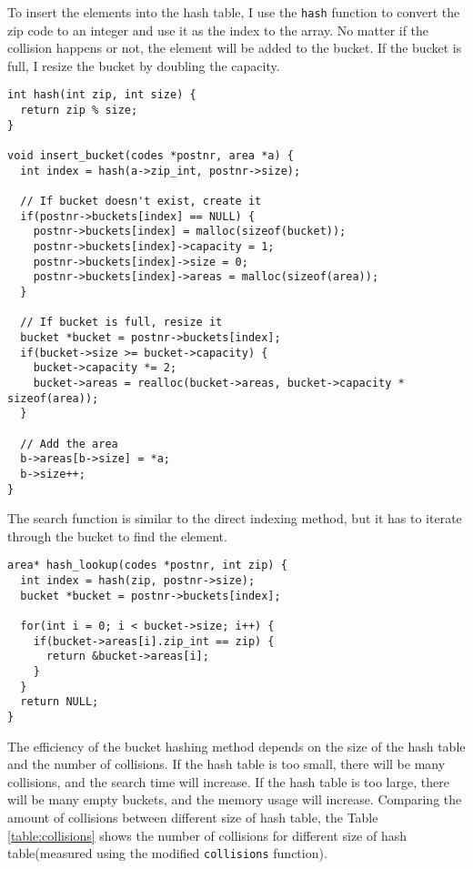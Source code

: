 \documentclass[a4paper,11pt]{article}
\begin{document}
To insert the elements into the hash table, I use the {\tt hash} function to convert the zip code to an integer
and use it as the index to the array. No matter if the collision happens or not, the element will be added to the bucket.
If the bucket is full, I resize the bucket by doubling the capacity.

\begin{verbatim}
int hash(int zip, int size) {
  return zip % size;
}

void insert_bucket(codes *postnr, area *a) {
  int index = hash(a->zip_int, postnr->size);
  
  // If bucket doesn't exist, create it
  if(postnr->buckets[index] == NULL) {
    postnr->buckets[index] = malloc(sizeof(bucket));
    postnr->buckets[index]->capacity = 1;
    postnr->buckets[index]->size = 0;
    postnr->buckets[index]->areas = malloc(sizeof(area));
  }
  
  // If bucket is full, resize it
  bucket *bucket = postnr->buckets[index];
  if(bucket->size >= bucket->capacity) {
    bucket->capacity *= 2;
    bucket->areas = realloc(bucket->areas, bucket->capacity * sizeof(area));
  }
  
  // Add the area
  b->areas[b->size] = *a;
  b->size++;
}
\end{verbatim}

The search function is similar to the direct indexing method, 
but it has to iterate through the bucket to find the element.

\begin{verbatim}
area* hash_lookup(codes *postnr, int zip) {
  int index = hash(zip, postnr->size);
  bucket *bucket = postnr->buckets[index];
  
  for(int i = 0; i < bucket->size; i++) {
    if(bucket->areas[i].zip_int == zip) {
      return &bucket->areas[i];
    }
  }
  return NULL;
}
\end{verbatim}

The efficiency of the bucket hashing method depends on the size of the hash table and the number of collisions.
If the hash table is too small, there will be many collisions, and the search time will increase.
If the hash table is too large, there will be many empty buckets, and the memory usage will increase.
Comparing the amount of collisions between different size of hash table, the Table \ref{table:collisions} shows 
the number of collisions for different size of hash table(measured using the modified {\tt collisions} function).
\end{document}
